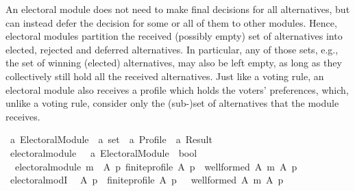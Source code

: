 \begin{isabellebody}
\begin{isamarkuptext}
An electoral module does not need to make final decisions for all alternatives,
but can instead defer the decision for some or all of them to other modules.
Hence, electoral modules partition the received (possibly empty) set of
alternatives into elected, rejected and deferred alternatives. In particular,
any of those sets, e.g., the set of winning (elected) alternatives, may also
be left empty, as long as they collectively still hold all the received
alternatives. Just like a voting rule, an electoral module also receives a
profile which holds the voters’ preferences, which, unlike a voting rule,
consider only the (sub-)set of alternatives that the module receives.%
\end{isamarkuptext}\isamarkuptrue%
%
\isadelimdocument
%
\endisadelimdocument
%
\isatagdocument
%
\isamarkuptrue%
%
\endisatagdocument
{\isafolddocument}%
%
\isadelimdocument
%
\endisadelimdocument
{}\isamarkupfalse%
\ {\isacharprime}{\kern0pt}a\ Electoral{\isacharunderscore}{\kern0pt}Module\ {\isacharequal}{\kern0pt}\ {\isachardoublequoteopen}{\isacharprime}{\kern0pt}a\ set\ {\isasymRightarrow}\ {\isacharprime}{\kern0pt}a\ Profile\ {\isasymRightarrow}\ {\isacharprime}{\kern0pt}a\ Result{\isachardoublequoteclose}%
\isadelimdocument
%
\endisadelimdocument
%
\isatagdocument
%
\isamarkuptrue%
%
\endisatagdocument
{\isafolddocument}%
%
\isadelimdocument
%
\endisadelimdocument
{}\isamarkupfalse%
\ electoral{\isacharunderscore}{\kern0pt}module\ {\isacharcolon}{\kern0pt}{\isacharcolon}{\kern0pt}\ {\isachardoublequoteopen}\ {\isacharprime}{\kern0pt}a\ Electoral{\isacharunderscore}{\kern0pt}Module\ {\isasymRightarrow}\ bool{\isachardoublequoteclose}\ \isanewline
\ \ {\isachardoublequoteopen}electoral{\isacharunderscore}{\kern0pt}module\ m\ {\isasymequiv}\ {\isasymforall}A\ p{\isachardot}{\kern0pt}\ finite{\isacharunderscore}{\kern0pt}profile\ A\ p\ {\isasymlongrightarrow}\ well{\isacharunderscore}{\kern0pt}formed\ A\ {\isacharparenleft}{\kern0pt}m\ A\ p{\isacharparenright}{\kern0pt}{\isachardoublequoteclose}\isanewline
\isanewline
{}\isamarkupfalse%
\ electoral{\isacharunderscore}{\kern0pt}modI{\isacharcolon}{\kern0pt}\isanewline
\ \ {\isachardoublequoteopen}{\isacharparenleft}{\kern0pt}{\isacharparenleft}{\kern0pt}{\isasymAnd}A\ p{\isachardot}{\kern0pt}\ {\isasymlbrakk}\ finite{\isacharunderscore}{\kern0pt}profile\ A\ p\ {\isasymrbrakk}\ {\isasymLongrightarrow}\ well{\isacharunderscore}{\kern0pt}formed\ A\ {\isacharparenleft}{\kern0pt}m\ A\ p{\isacharparenright}{\kern0pt}{\isacharparenright}{\kern0pt}\ {\isasymLongrightarrow}\isanewline

\end{isabellebody}
